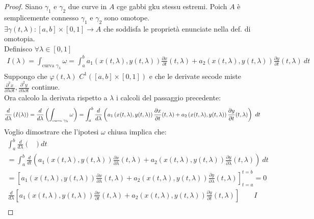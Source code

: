 \documentclass[a4paper, oneside]{article}
\begin{document}
\begin{proof}
    Siano $\gamma_1$ e $\gamma_2$ due curve in $A$ cge gabbi gku stessu estremi. Poich $A$ è semplicemente connesso $\gamma_1$ e $\gamma_2$ sono omotope.\\
    $\exists \gamma(t, \lambda) :[a,b]\times[0,1] \to A$ che soddisfa le proprietà enunciate nella def. di omotopia.\\
    Definisco $\forall \lambda \in [0,1]$
    \begin{gather*}
        I(\lambda) = \int_{\text{curva }\gamma_\lambda} \omega = \int_{a}^{b} a_1 \left( x(t,\lambda) , y (t,\lambda) \right) \frac{\partial x}{\partial t}(t,\lambda) + a_2 \left( x(t,\lambda) , y (t,\lambda) \right) \frac{\partial y}{\partial t}(t,\lambda) \ dt
    \end{gather*}
    Suppongo che $\varphi(t,\lambda)$  $C^1\left( [a,b] \times [0,1] \right)$ e che le derivate secode miste $\frac{\partial^2 x}{\partial \lambda \partial t}, \frac{\partial^2 y}{\partial \lambda \partial t}$  continue.\\
    Ora calcolo la derivata rispetto a $\lambda$ i calcoli del passaggio precedente:
    \begin{gather*}
        \frac{d}{d\lambda}\left(I(\lambda) \right) = \frac{d}{d\lambda}\left(\int_{\text{\tiny curva \normalsize}\gamma_\lambda} \omega\right)  = \int_{a}^{b} \frac{d}{d\lambda}\left(a_1 \left( x(t,\lambda) , y (t,\lambda) \right) \frac{\partial x}{\partial t}(t,\lambda) + a_2 \left( x(t,\lambda) , y (t,\lambda) \right) \frac{\partial y}{\partial t}(t,\lambda)\right)  \ dt
    \end{gather*}
    Voglio dimostrare che l'ipotesi $\omega$ chiusa implica che:
    \begin{gather*}
        \int_{a}^{b} \frac{d}{d \lambda}\left( \ \ \  \right)dt\\
        = \int_{a}^{b} \frac{d}{dt}\left( a_1(x(t, \lambda),y(t, \lambda))\frac{\partial x}{\partial \lambda}(t, \lambda) + a_2(x(t, \lambda),y(t, \lambda))\frac{\partial y}{\partial \lambda}(t, \lambda)\right)  \ dt \\
        = \left[a_1(x(t, \lambda),y(t, \lambda))\frac{\partial x}{\partial \lambda}(t, \lambda) + a_2(x(t, \lambda),y(t, \lambda))\frac{\partial y}{\partial \lambda}(t, \lambda)\right]_{t=a}^{t=b} = 0 
    \end{gather*}
    \begin{gather*}
        \frac{d}{d\lambda}\left[ a_1(x(t,\lambda),y(t,\lambda)) \frac{\partial x}{\partial t}(t, \lambda) + a_2(x(t,\lambda),y(t,\lambda)) \frac{\partial y}{\partial t}(t, \lambda) \right] \qquad \boxed{I} \\

\end{gather*}
\end{proof}
\end{document}
